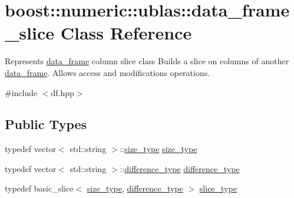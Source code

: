 \hypertarget{classboost_1_1numeric_1_1ublas_1_1data__frame__slice}{}\section{boost\+:\+:numeric\+:\+:ublas\+:\+:data\+\_\+frame\+\_\+slice Class Reference}
\label{classboost_1_1numeric_1_1ublas_1_1data__frame__slice}


Represents \hyperlink{classboost_1_1numeric_1_1ublas_1_1data__frame}{data\+\_\+frame} column slice class Builds a slice on columns of another \hyperlink{classboost_1_1numeric_1_1ublas_1_1data__frame}{data\+\_\+frame}. Allows access and modifications operations.  




{\ttfamily \#include $<$df.\+hpp$>$}

\subsection*{Public Types}
\begin{DoxyCompactItemize}
\item 
typedef vector$<$ std\+::string $>$\+::\hyperlink{classboost_1_1numeric_1_1ublas_1_1data__frame__slice_a64882afbb9ec95de2ba7b7f2c67c6549}{size\+\_\+type} \hyperlink{classboost_1_1numeric_1_1ublas_1_1data__frame__slice_a64882afbb9ec95de2ba7b7f2c67c6549}{size\+\_\+type}
\item 
typedef vector$<$ std\+::string $>$\+::\hyperlink{classboost_1_1numeric_1_1ublas_1_1data__frame__slice_ab8da22e0f4069692d24bc0269f7d8281}{difference\+\_\+type} \hyperlink{classboost_1_1numeric_1_1ublas_1_1data__frame__slice_ab8da22e0f4069692d24bc0269f7d8281}{difference\+\_\+type}
\item 
typedef basic\+\_\+slice$<$ \hyperlink{classboost_1_1numeric_1_1ublas_1_1data__frame__slice_a64882afbb9ec95de2ba7b7f2c67c6549}{size\+\_\+type}, \hyperlink{classboost_1_1numeric_1_1ublas_1_1data__frame__slice_ab8da22e0f4069692d24bc0269f7d8281}{difference\+\_\+type} $>$ \hyperlink{classboost_1_1numeric_1_1ublas_1_1data__frame__slice_a218c8259c584054d643724fd8f74450c}{slice\+\_\+type}
\end{DoxyCompactItemize}
